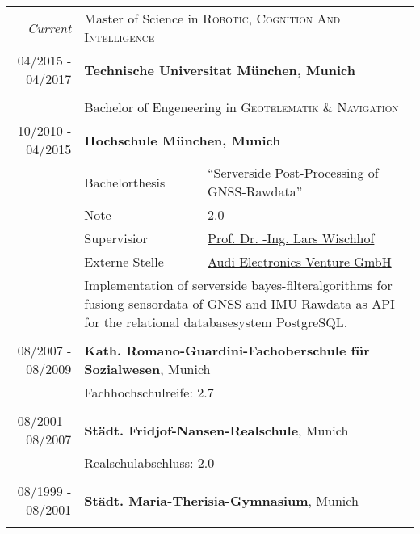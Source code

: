 \documentclass[a4paper,10pt]{article} %
\begin{document}
\begin{tabular}{r|l@{: }p{11cm}}
\emph{Current} & \multicolumn{2}{p{11cm}}{Master of Science in \textsc{Robotic, Cognition And Intelligence}}\\
\textsc{04/2015 - 04/2017} & \multicolumn{2}{p{11cm}}{\textbf{Technische Universitat München, Munich}} \\
\multicolumn{3}{c}{}\\
& \multicolumn{2}{p{11cm}}{Bachelor of Engeneering in \textsc{Geotelematik \& Navigation}}\\
\textsc{10/2010 - 04/2015} & \multicolumn{2}{p{11cm}}{\textbf{Hochschule München, Munich}} \\
                           & \small Bachelorthesis & \small ``Serverside Post-Processing of GNSS-Rawdata'' \\
                           & \small Note           & \small 2.0\\
			   & \small Supervisior       & \small \href{mailto:lars.wischhof@hm.edu}{Prof. Dr. -Ing. Lars Wischhof}\\
                           & \small Externe Stelle & \small \href{http://www.audi-electronics-venture.de}{Audi Electronics Venture GmbH} \\
                           & \multicolumn{2}{p{11cm}}{\small Implementation of serverside bayes-filteralgorithms for fusiong sensordata of GNSS and IMU Rawdata as API for the relational databasesystem PostgreSQL.}\\
\multicolumn{3}{c}{}\\
 
 
\textsc{08/2007 - 08/2009} & \multicolumn{2}{p{11cm}}{\textbf{Kath. Romano-Guardini-Fachoberschule für Sozialwesen}, Munich} \\
                           & \multicolumn{2}{p{11cm}}{\small Fachhochschulreife: 2.7}                                         \\
\multicolumn{3}{c}{}                                                                                \\
 
 
\textsc{08/2001 - 08/2007} & \multicolumn{2}{p{11cm}}{\textbf{Städt. Fridjof-Nansen-Realschule}, Munich} \\
                           & \multicolumn{2}{p{11cm}}{\small Realschulabschluss: 2.0} \\
\multicolumn{3}{c}{}\\
 
 
\textsc{08/1999 - 08/2001} & \multicolumn{2}{p{11cm}}{\textbf{Städt. Maria-Therisia-Gymnasium}, Munich} \\
\multicolumn{3}{c}{}\\
\end{tabular}
 
\end{document}
